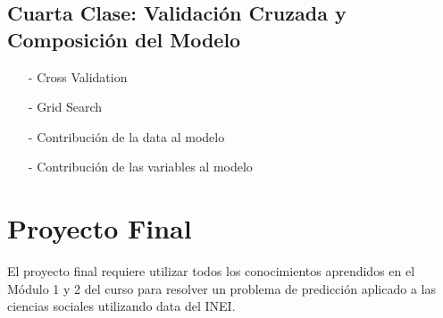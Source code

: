 \documentclass[12pt]{article}
\begin{document}
\subsection*{Cuarta Clase: Validación Cruzada y Composición del Modelo}
\begin{itemize}
\item[-]	Cross Validation
\item[-]	Grid Search
\item[-]	Contribución de la data al modelo
\item[-]	Contribución de las variables al modelo
\end{itemize}

\section*{Proyecto Final}

El proyecto final requiere utilizar todos los conocimientos aprendidos en el Módulo 1 y 2 del curso para resolver un problema de predicción aplicado a las ciencias sociales utilizando data del INEI.
\end{document}
